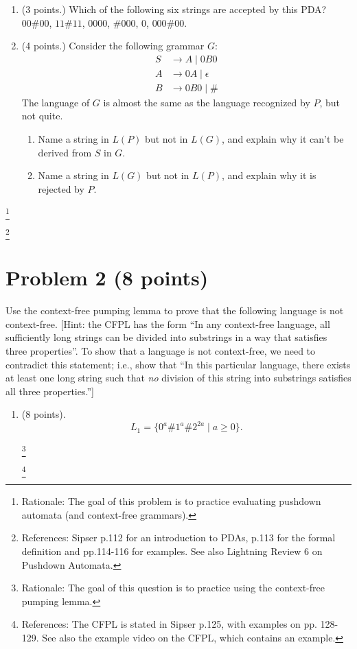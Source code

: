 \documentclass[letterpaper,11pt,twoside]{article}
\theoremstyle{plain}
\theoremstyle{definition}
\theoremstyle{remark}
\theoremstyle{restate}
\newcommand\blfootnote[1]{%
  \begingroup
  \renewcommand\thefootnote{}\footnote{#1}%
  \addtocounter{footnote}{-1}%
  \endgroup
}
\begin{document}
    \begin{enumerate}
        \item (3 points.) Which of the following six strings are accepted by this PDA? $00\#00$, $11\#11$, $0000$, $\#000$, $0$, $000\#00$.
        
        \item (4 points.) Consider the following grammar $G$:
        \begin{align*}
            S &\rightarrow A \; | \; 0B0 \\
            A &\rightarrow 0A \; | \; \epsilon \\
            B &\rightarrow 0B0 \; | \; \#
        \end{align*}
        The language of $G$ is almost the same as the language recognized by $P$, but not quite.
        \begin{enumerate}
            \item Name a string in $L(P)$ but not in $L(G)$, and explain why it can't be derived from $S$ in $G$.
            
            \item Name a string in $L(G)$ but not in $L(P)$, and explain why it is rejected by $P$.
        \end{enumerate}
    \end{enumerate}

    \blfootnote{ Rationale: The goal of this problem is to practice evaluating pushdown automata (and context-free grammars). }
    \blfootnote{ References: Sipser p.112 for an introduction to PDAs, p.113 for the formal definition and pp.114-116 for examples. See also Lightning Review 6 on Pushdown Automata. }



\clearpage
\section{Problem 2 (8 points)}

Use the context-free pumping lemma to prove that the following language is not context-free. [Hint: the CFPL has the form ``In any context-free language, all sufficiently long strings can be divided into substrings in a way that satisfies three properties''. To show that a language is not context-free, we need to contradict this statement; i.e., show that ``In this particular language, there exists at least one long string such that \emph{no} division of this string into substrings satisfies all three properties.'']
\begin{enumerate}
    \item (8 points).
    \[
        L_1 = \{0^a\#1^a\#2^{2a} \; | \; a \geq 0\}.
    \]
    
    \blfootnote{ Rationale: The goal of this question is to practice using the context-free pumping lemma. }
    \blfootnote{ References: The CFPL is stated in Sipser p.125, with examples on pp. 128-129. See also the example video on the CFPL, which contains an example. }
\end{enumerate}
\end{document}
